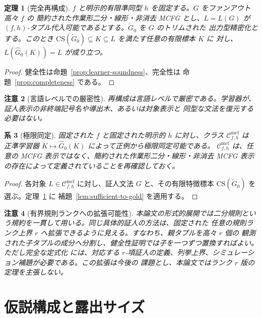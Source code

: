 \documentclass[11pt,a4paper]{ltjsarticle}
\newtheorem{theorem}{定理}[section]
\newtheorem{corollary}[theorem]{系}
\newtheorem{remark}[theorem]{注意}
\theoremstyle{remark}
\newcommand{\CS}{\mathrm{CS}}
\newcommand{\Cmcf}[2]{\mathcal{C}^{\mathrm{mcf}}_{#1,#2}}
\begin{document}
\begin{theorem}[完全再構成]
\label{thm:exact-reconstruction}
\(f\) と明示的有限準同型 \(h\) を固定する。\(G\) をファンアウト高々 \(f\) の
簡約された作業形二分・線形・非消去 MCFG とし、\(L=L(G)\) が
\((f,h)\)-タプル代入可能であるとする。\(\widetilde G_0\) を \(G\) のトリムされた
出力型精密化とする。このとき
\(\CS(\widetilde G_0)\subseteq K\subseteq L\) を満たす任意の有限標本 \(K\) に
対し、\(L(\widehat G_0(K))=L\) が成り立つ。
\end{theorem}

\begin{proof}
健全性は命題~\ref{prop:learner-soundness}、完全性は
命題~\ref{prop:completeness} である。
\end{proof}

\begin{remark}[言語レベルでの厳密性]
\label{rem:language-level-exactness}
再構成は言語レベルで厳密である。学習器が、証人表示の非終端記号名や導出木、あるいは対象表示と
同型な文法を復元する必要はない。
\end{remark}

\begin{corollary}[極限同定]
\label{cor:gold}
固定された \(f\) と固定された明示的 \(h\) に対し、クラス \(\Cmcf{f}{h}\) は
正準学習器 \(K\mapsto\widehat G_0(K)\) によって正例から極限同定可能である。
\(\Cmcf{f}{h}\) は、任意の MCFG 表示ではなく、簡約された作業形二分・線形・非消去
MCFG 表示の存在によって定義されていることを再確認しておく。
\end{corollary}

\begin{proof}
各対象 \(L\in\Cmcf{f}{h}\) に対し、証人文法 \(G\) と、その有限特徴標本
\(\CS(\widetilde G_0)\) を選ぶ。定理~\ref{thm:exact-reconstruction} に
補題~\ref{lem:sufficient-to-gold} を適用する。
\end{proof}

\begin{remark}[有界規則ランクへの拡張可能性]
\label{rem:bounded-rule-rank}
本論文の形式的展開では二分規則という規約を一貫して用いる。同じ具体的証人の方法は、固定された
任意の規則ランク上界 \(r\) へ拡張できるように見える。すなわち、親タプルを高々 \(r\) 個の
観測された子タプルの成分へ分割し、健全性証明では子を一つずつ置換すればよい。ただし完全な定式化
には、対応する \(r\)-項証人の定義、列挙上界、シミュレーション補題が必要である。この拡張は今後の
課題とし、本論文ではランク \(r\) 版の定理を主張しない。
\end{remark}


\section{仮説構成と露出サイズ}
\label{sec:poly-time}
\end{document}
